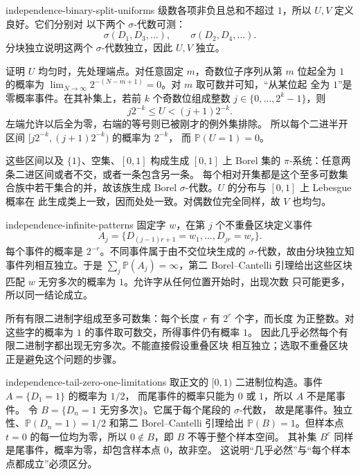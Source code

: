 \begin{solution}{independence-binary-split-uniforms}
级数各项非负且总和不超过 $1$，所以 $U,V$ 定义良好。它们分别对
以下两个 $\sigma$-代数可测：
\[
 \sigma(D_1,D_3,\ldots),\qquad \sigma(D_2,D_4,\ldots).
\]
分块独立说明这两个 $\sigma$-代数独立，因此 $U,V$ 独立。

证明 $U$ 均匀时，先处理端点。对任意固定 $m$，奇数位子序列从第 $m$
位起全为 $1$ 的概率为
$\lim_{N\to\infty}2^{-(N-m+1)}=0$。对 $m$ 取可数并可知，“从某位起
全为 $1$”是零概率事件。在其补集上，若前 $k$ 个奇数位组成整数
$j\in\{0,\ldots,2^k-1\}$，则
\[
 j2^{-k}\le U<(j+1)2^{-k}.
\]
左端允许以后全为零，右端的等号则已被刚才的例外集排除。
所以每个二进半开区间 $[j2^{-k},(j+1)2^{-k})$ 的概率为 $2^{-k}$，
而 $\mathbb P(U=1)=0$。

这些区间以及 $\{1\}$、空集、$[0,1]$ 构成生成 $[0,1]$ 上 Borel 集的
$\pi$-系统：任意两条二进区间或者不交，或者一条包含另一条。
每个相对开集都是这个至多可数集合族中若干集合的并，故该族生成 Borel
$\sigma$-代数。$U$ 的分布与 $[0,1]$ 上 Lebesgue 概率在
此生成类上一致，因而处处一致。对偶数位完全同样，故 $V$ 也均匀。
\end{solution}

\begin{solution}{independence-infinite-patterns}
固定字 $w$，在第 $j$ 个不重叠区块定义事件
\[
 A_j=\{D_{(j-1)r+1}=w_1,\ldots,D_{jr}=w_r\}.
\]
每个事件的概率是 $2^{-r}$。不同事件属于由不交位块生成的
$\sigma$-代数，故由分块独立知事件列相互独立。于是
$\sum_j\mathbb P(A_j)=\infty$，第二 Borel--Cantelli 引理给出这些区块
匹配 $w$ 无穷多次的概率为 $1$。允许字从任何位置开始时，出现次数
只可能更多，所以同一结论成立。

所有有限二进制字组成至多可数集：每个长度 $r$ 有 $2^r$ 个字，而长度
为正整数。对这些字的概率为 $1$ 的事件取可数交，所得事件仍有概率 $1$。
因此几乎必然每个有限二进制字都出现无穷多次。不能直接假设重叠区块
相互独立；选取不重叠区块正是避免这个问题的步骤。
\end{solution}

\begin{solution}{independence-tail-zero-one-limitations}
取正文的 $[0,1)$ 二进制位构造。事件 $A=\{D_1=1\}$ 的概率为 $1/2$，
而尾事件的概率只能为 $0$ 或 $1$，所以 $A$ 不是尾事件。
令 $B=\{D_n=1\text{ 无穷多次}\}$。它属于每个尾段的 $\sigma$-代数，
故是尾事件。独立性、$\mathbb P(D_n=1)=1/2$ 和第二 Borel--Cantelli
引理给出 $\mathbb P(B)=1$。但样本点 $t=0$ 的每一位均为零，所以
$0\notin B$，即 $B$ 不等于整个样本空间。
其补集 $B^c$ 同样是尾事件，概率为零，却包含样本点 $0$，故非空。
这说明“几乎必然”与“每个样本点都成立”必须区分。
\end{solution}
